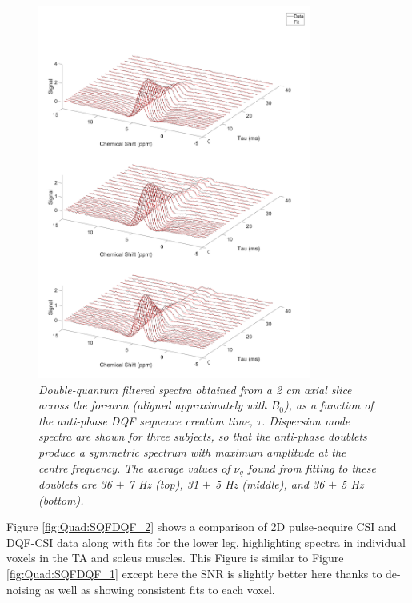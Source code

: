 \documentclass[class=article, crop=false]{standalone}
\begin{document}
\begin{figure}
    \centering
    \includegraphics[width=0.8\textwidth]{Figures/Quad/Bulk_DQF_2.png}
    \caption{\textit{Double-quantum filtered spectra obtained from a 2 cm axial slice across the forearm (aligned approximately with $B_0$), as a function of the anti-phase DQF sequence creation time, $\tau$. Dispersion mode spectra are shown for three subjects, so that the anti-phase doublets produce a symmetric spectrum with maximum amplitude at the centre frequency. The average values of $\nu_q$ found from fitting to these doublets are 36 $\pm$ 7 Hz (top), 31 $\pm$ 5 Hz (middle), and 36 $\pm$ 5 Hz (bottom).}}
    \label{fig:Quad:Bulk_DQF_2}
\end{figure}

Figure \ref{fig:Quad:SQFDQF_2} shows a comparison of 2D pulse-acquire CSI and DQF-CSI data along with fits for the lower leg, highlighting spectra in individual voxels in the TA and soleus muscles. This Figure is similar to Figure \ref{fig:Quad:SQFDQF_1} except here the SNR is slightly better here thanks to de-noising as well as showing consistent fits to each voxel.
\end{document}
